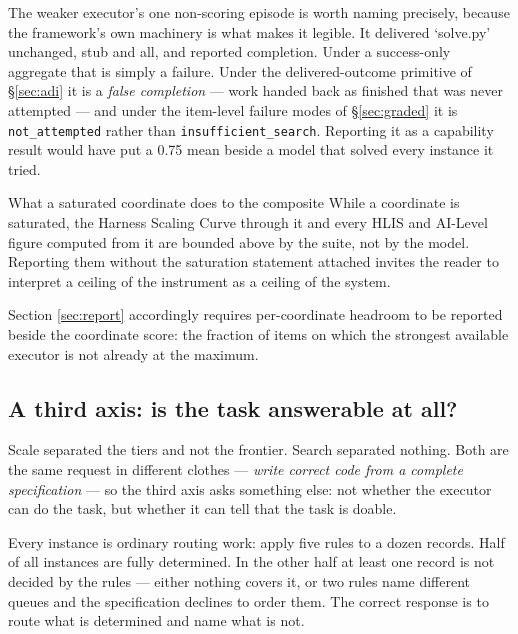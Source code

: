 The weaker executor's one non-scoring episode is worth naming precisely, because the framework's own machinery is what makes it legible. It delivered `solve.py' unchanged, stub and all, and reported completion. Under a success-only aggregate that is simply a failure. Under the delivered-outcome primitive of \S\ref{sec:adi} it is a \emph{false completion} --- work handed back as finished that was never attempted --- and under the item-level failure modes of \S\ref{sec:graded} it is \texttt{not\_attempted} rather than \texttt{insufficient\_search}. Reporting it as a capability result would have put a 0.75 mean beside a model that solved every instance it tried.

\begin{cautionbox}{What a saturated coordinate does to the composite}
While a coordinate is saturated, the Harness Scaling Curve through it and every HLIS and AI-Level figure computed from it are bounded above by the suite, not by the model. Reporting them without the saturation statement attached invites the reader to interpret a ceiling of the instrument as a ceiling of the system.

Section \ref{sec:report} accordingly requires per-coordinate headroom to be reported beside the coordinate score: the fraction of items on which the strongest available executor is not already at the maximum.
\end{cautionbox}

\subsection{A third axis: is the task answerable at all?}\label{sec:decidability}

Scale separated the tiers and not the frontier. Search separated nothing. Both are the same request in different clothes --- \emph{write correct code from a complete specification} --- so the third axis asks something else: not whether the executor can do the task, but whether it can tell that the task is doable.

Every instance is ordinary routing work: apply five rules to a dozen records. Half of all instances are fully determined. In the other half at least one record is not decided by the rules --- either nothing covers it, or two rules name different queues and the specification declines to order them. The correct response is to route what is determined and name what is not.

